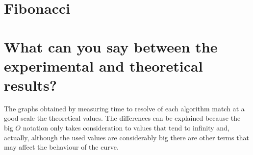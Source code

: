 \documentclass[a4paper,12pt]{article}
\begin{document}
    \section{Fibonacci}
    \begin{figure}[ht]
      \begin{floatrow}
      \end{floatrow}
    \end{figure}

    \section{What can you say between the experimental and theoretical results?}
    The graphs obtained by measuring time to resolve of each algorithm match at a good scale
    the theoretical values. The differences can be explained because the big $O$ notation only takes
    consideration to values that tend to infinity and, actually, although the used values are
    considerably big there are other terms that may affect the behaviour of the curve.
\end{document}
